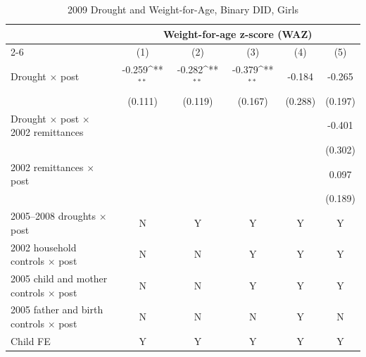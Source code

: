 \documentclass[12pt]{article}
\def\sym#1{\ifmmode^{#1}\else\(^{#1}\)\fi}
\begin{document}
\begin{longtable}{l*{5}{c}}
\caption{2009 Drought and Weight-for-Age, Binary DID, Girls}\\
\toprule
 & \multicolumn{5}{c}{Weight-for-age z-score (WAZ)}\\
\cmidrule(lr){2-6}
            &\multicolumn{1}{c}{(1)}         &\multicolumn{1}{c}{(2)}         &\multicolumn{1}{c}{(3)}         &\multicolumn{1}{c}{(4)}         &\multicolumn{1}{c}{(5)}         \\
\midrule
Drought \ensuremath{\times} post&      -0.259\sym{**} &      -0.282\sym{**} &      -0.379\sym{**} &      -0.184         &      -0.265         \\
            &     (0.111)         &     (0.119)         &     (0.167)         &     (0.288)         &     (0.197)         \\
Drought \ensuremath{\times} post \ensuremath{\times} 2002 remittances&                     &                     &                     &                     &      -0.401         \\
            &                     &                     &                     &                     &     (0.302)         \\
2002 remittances \ensuremath{\times} post&                     &                     &                     &                     &       0.097         \\
            &                     &                     &                     &                     &     (0.189)         \\
\midrule
2005--2008 droughts \ensuremath{\times} post&           N         &           Y         &           Y         &           Y         &           Y         \\
2002 household controls \ensuremath{\times} post&           N         &           N         &           Y         &           Y         &           Y         \\
2005 child and mother controls \ensuremath{\times} post&           N         &           N         &           Y         &           Y         &           Y         \\
2005 father and birth controls \ensuremath{\times} post&           N         &           N         &           N         &           Y         &           N         \\
Child FE    &           Y         &           Y         &           Y         &           Y         &           Y         \\

\end{longtable}
\end{document}
